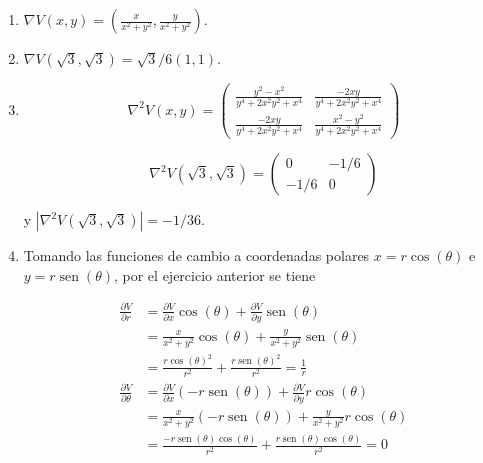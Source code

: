 \documentclass[
  spanish,
  a4paper,
]{scrreport}
\theoremstyle{definition}
\theoremstyle{remark}
\begin{document}
\begin{tcolorbox}[enhanced jigsaw, arc=.35mm, bottomrule=.15mm, bottomtitle=1mm, breakable, colback=white, colbacktitle=quarto-callout-tip-color!10!white, colframe=quarto-callout-tip-color-frame, coltitle=black, left=2mm, leftrule=.75mm, opacityback=0, opacitybacktitle=0.6, rightrule=.15mm, title=\textcolor{quarto-callout-tip-color}{\faLightbulb}\hspace{0.5em}{Solución}, titlerule=0mm, toprule=.15mm, toptitle=1mm]

\begin{enumerate}
\def\labelenumi{\alph{enumi}.}
\item
  \(\nabla V(x,y) = \left( \frac{x}{x^2+y^2},\frac{y}{x^2+y^2}\right)\).
\item
  \(\nabla V(\sqrt 3, \sqrt 3) = \sqrt 3 /6(1,1)\).
\item
  \[
  \nabla^2V(x,y) = \left(
  \begin{array}{cc}
  \frac{y^2-x^2}{y^4+2x^2y^2+x^4} & \frac{-2xy}{y^4+2x^2y^2+x^4} \\
  \frac{-2xy}{y^4+2x^2y^2+x^4} & \frac{x^2-y^2}{y^4+2x^2y^2+x^4}
  \end{array}
  \right)
  \]

  \[
  \nabla^2V(\sqrt{3},\sqrt{3}) = 
  \left(
  \begin{array}{cc}
  0 & -1/6 \\
  -1/6 & 0
  \end{array}
  \right)
  \]

  y \(|\nabla^2V(\sqrt 3,\sqrt 3)| = -1/36.\)
\item
  Tomando las funciones de cambio a coordenadas polares
  \(x=r\cos(\theta)\) e \(y=r\operatorname{sen}(\theta)\), por el
  ejercicio anterior se tiene

  \begin{align*}
  \frac{\partial V}{\partial r} 
  &= \frac{\partial V}{\partial x}\cos(\theta) + \frac{\partial V}{\partial y}\operatorname{sen}(\theta) \\
  &= \frac{x}{x^2+y^2} \cos(\theta) + \frac{y}{x^2+y^2}\operatorname{sen}(\theta) \\
  &= \frac{r \cos(\theta)^2}{r^2} + \frac{r \operatorname{sen}(\theta)^2}{r^2} 
  = \frac{1}{r} \\
  \frac{\partial V}{\partial \theta} 
  &= \frac{\partial V}{\partial x}(-r\operatorname{sen}(\theta)) + \frac{\partial V}{\partial y}r\cos(\theta) \\
  &= \frac{x}{x^2+y^2} (-r\operatorname{sen}(\theta)) + \frac{y}{x^2+y^2}r\cos(\theta) \\
  &= \frac{-r \operatorname{sen}(\theta)\cos(\theta)}{r^2} + \frac{r \operatorname{sen}(\theta)\cos(\theta)}{r^2}
  = 0 \\
  \end{align*}


\end{enumerate}
\end{tcolorbox}
\end{document}
